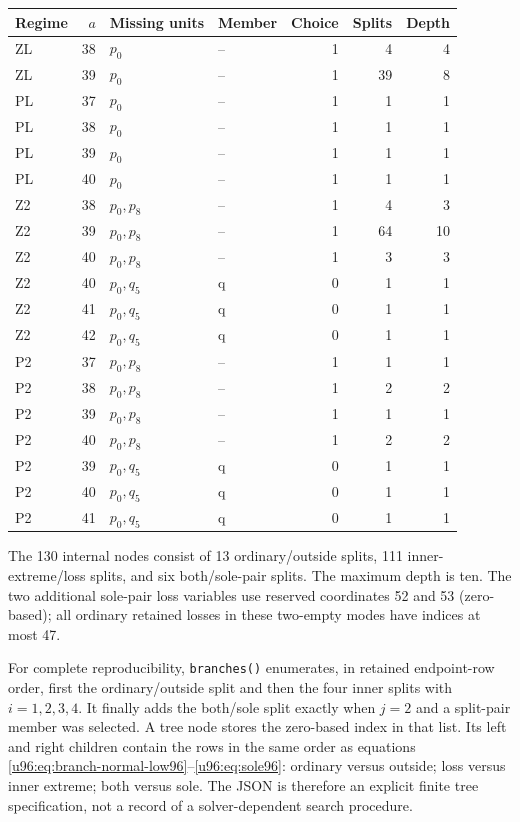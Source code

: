 \documentclass[11pt,a4paper]{article}
\theoremstyle{remark}
\begin{document}
\begin{center}\small
\begin{tabular}{lrllrrr}
\toprule
Regime&$a$&Missing units&Member&Choice&Splits&Depth\\\midrule
ZL&38&$p_0$&--&1&4&4\\
ZL&39&$p_0$&--&1&39&8\\
PL&37&$p_0$&--&1&1&1\\
PL&38&$p_0$&--&1&1&1\\
PL&39&$p_0$&--&1&1&1\\
PL&40&$p_0$&--&1&1&1\\
Z2&38&$p_0,p_8$&--&1&4&3\\
Z2&39&$p_0,p_8$&--&1&64&10\\
Z2&40&$p_0,p_8$&--&1&3&3\\
Z2&40&$p_0,q_5$&q&0&1&1\\
Z2&41&$p_0,q_5$&q&0&1&1\\
Z2&42&$p_0,q_5$&q&0&1&1\\
P2&37&$p_0,p_8$&--&1&1&1\\
P2&38&$p_0,p_8$&--&1&2&2\\
P2&39&$p_0,p_8$&--&1&1&1\\
P2&40&$p_0,p_8$&--&1&2&2\\
P2&39&$p_0,q_5$&q&0&1&1\\
P2&40&$p_0,q_5$&q&0&1&1\\
P2&41&$p_0,q_5$&q&0&1&1\\
\bottomrule
\end{tabular}
\end{center}

The 130 internal nodes consist of 13 ordinary/outside splits, 111
inner-extreme/loss splits, and six both/sole-pair splits. The maximum
depth is ten. The two additional sole-pair loss variables use reserved
coordinates 52 and 53 (zero-based); all ordinary retained losses in
these two-empty modes have indices at most 47.

For complete reproducibility, \texttt{branches()} enumerates, in retained
endpoint-row order, first the ordinary/outside split and then the four
inner splits with $i=1,2,3,4$. It finally adds the both/sole split exactly
when $j=2$ and a split-pair member was selected. A tree node stores the
zero-based index in that list. Its left and right children contain the
rows in the same order as equations
\eqref{u96:eq:branch-normal-low96}--\eqref{u96:eq:sole96}:
ordinary versus outside; loss versus inner extreme; both versus sole.
The JSON is therefore an explicit finite tree specification, not a
record of a solver-dependent search procedure.
\end{document}
